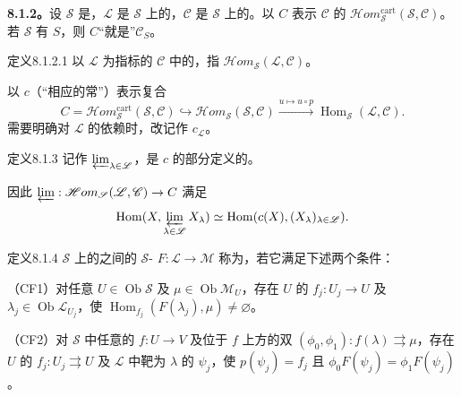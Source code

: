 \textbf{8.1.2。}设 $\mathscr S$ 是，$\mathscr L$ 是 $\mathscr S$ 上的，$\mathscr C$ 是 $\mathscr S$ 上的。以 $C$ 表示 $\mathscr C$ 的 $\mathscr Hom_{\mathscr S}^{\mathrm{cart}}(\mathscr S,\mathscr C)$。若 $\mathscr S$ 有 $S$，则 $C$“就是”$\mathscr C_S$。
\begin{SGAresult}{定义}{8.1.2.1}
以 $\mathscr L$ 为指标的 $\mathscr C$ 中的，指 $\mathscr Hom_{\mathscr S}(\mathscr L,\mathscr C)$。
\end{SGAresult}
以 $c$（“相应的常”）表示复合
\[C=\mathscr Hom_{\mathscr S}^{\mathrm{cart}}(\mathscr S,\mathscr C)\hookrightarrow\mathscr Hom_{\mathscr S}(\mathscr S,\mathscr C)\xrightarrow{u\mapsto u\circ p}\operatorname{Hom}_{\mathscr S}(\mathscr L,\mathscr C).
\]
需要明确对 $\mathscr L$ 的依赖时，改记作 $c_{\mathscr L}$。
\begin{SGAresult}{定义}{8.1.3}
记作 $\varprojlim_{\lambda\in\mathscr L}$，是 $c$ 的部分定义的。
\end{SGAresult}
因此 $\varprojlim:\mathscr Hom_{\mathscr S}(\mathscr L,\mathscr C)\to C$ 满足
\[\operatorname{Hom}(X,\varprojlim_{\lambda\in\mathscr L}X_\lambda)\simeq\operatorname{Hom}(c(X),(X_\lambda)_{\lambda\in\mathscr L}).\]
\begin{SGAresult}{定义}{8.1.4}
$\mathscr S$ 上的之间的 $\mathscr S$- $F:\mathscr L\to\mathscr M$ 称为，若它满足下述两个条件：

（CF1）对任意 $U\in\operatorname{Ob}\mathscr S$ 及 $\mu\in\operatorname{Ob}\mathscr M_U$，存在 $U$ 的 $f_j:U_j\to U$ 及 $\lambda_j\in\operatorname{Ob}\mathscr L_{U_j}$，使 $\operatorname{Hom}_{f_j}(F(\lambda_j),\mu)\ne\varnothing$。

（CF2）对 $\mathscr S$ 中任意的 $f:U\to V$ 及位于 $f$ 上方的双 $(\phi_0,\phi_1):f(\lambda)\rightrightarrows\mu$，存在 $U$ 的 $f_j:U_j\rightrightarrows U$ 及 $\mathscr L$ 中靶为 $\lambda$ 的 $\psi_j$，使 $p(\psi_j)=f_j$ 且 $\phi_0F(\psi_j)=\phi_1F(\psi_j)$。
\end{SGAresult}
